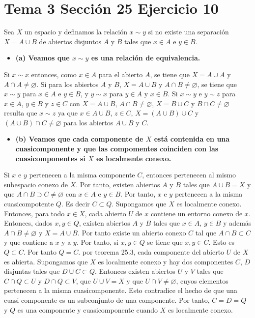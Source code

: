 \documentclass{article}
\begin{document}
\section{Tema 3 Sección 25 Ejercicio 10}
Sea $X$ un espacio y definamos la relación $x\sim y$ si no existe una separación $X=A\cup B$ de abiertos disjuntos $A$ y $B$ tales que $x\in A$ e $y\in B$.
\begin{itemize}
\item \bf (a) \rm Veamos que $x\sim y$ es una relación de equivalencia.
\end{itemize}
Si $x\sim x$ entonces, como $x\in A$ para el abierto $A$, se tiene que $X=A\cup A$ y $A\cap A\neq \varnothing$. Si para los abiertos $A$ y $B$, $X=A\cup B$ y $A\cap B\neq \varnothing$, se tiene que $x\sim y$ para $x\in A$ e $y\in B$, y $y\sim x$ para $y\in A$ y $x\in B$. Si $x\sim y$ e $y\sim z$ para $x\in A$, $y\in B$ y $z\in C$ con $X=A\cup B$, $A\cap B\neq \varnothing$, $X=B\cup C$ y $B\cap C\neq \varnothing$ resulta que $x\sim z$ ya que $x\in A\cup B$, $z\in C$, $X=(A\cup B)\cup C$ y $(A\cup B)\cap C\neq \varnothing$ para los abiertos $A\cup B$ y $C$.
\begin{itemize}
\item \bf (b) \rm Veamos que cada componente de $X$ está contenida en una cuasicomponente y que las compomentes coinciden con las cuasicomponentes si $X$ es localmente conexo.
\end{itemize}
Si $x$ e $y$ pertenecen a la misma componente $C$, entonces  pertenecen al mismo subespacio conexo de $X$. Por tanto, existen abiertos $A$ y $B$ tales que $A\cup B=X$ y que $A\cap B\supset C\neq \varnothing$ con $x\in A$ e $y\in B$. Por tanto, $x$ e $y$ pertenecen a la misma cuasicompotente $Q$. Es decir $C\subset Q$. Supongamos que $X$ es localmente conexo. Entonces, para todo $x\in X$, cada abierto $U$ de $x$ contiene un entorno conexo de $x$. Entonces, dados $x,y\in Q$, existen abiertos $A$ y $B$ tales que $x\in A$, $y\in B$ y además $A\cap B \neq \varnothing$ y $X=A\cup B$. Por tanto existe un abierto conexo $C$ tal que $A\cap B\subset C$ y que contiene a $x$ y a $y$. Por tanto, si $x,y \in Q$ se tiene que $x,y\in C$. Esto es $Q\subset C$. Por tanto $Q=C$. por teorema 25.3, cada componente del abierto $U$ de $X$ es abierta. Supongamos que $X$ es localmente conexo y hay dos componentes $C$, $D$ disjuntas tales que $D\cup C \subset Q$. Entonces existen abiertos $U$ y $V$ tales que  $C\cap Q\subset U$ y $D\cap Q\subset V$, que $U\cup V= X$ y que $U\cap V\neq \varnothing$, cuyos elementos pertenecen a la misma cuasicomponente. Esto  contradice el hecho de que una cuasi componente es un subconjunto de una componente. Por tanto, $C = D = Q$ y $Q$ es una componente y cuasicomponente cuando $X$ es localmente conexo.
\end{document}
